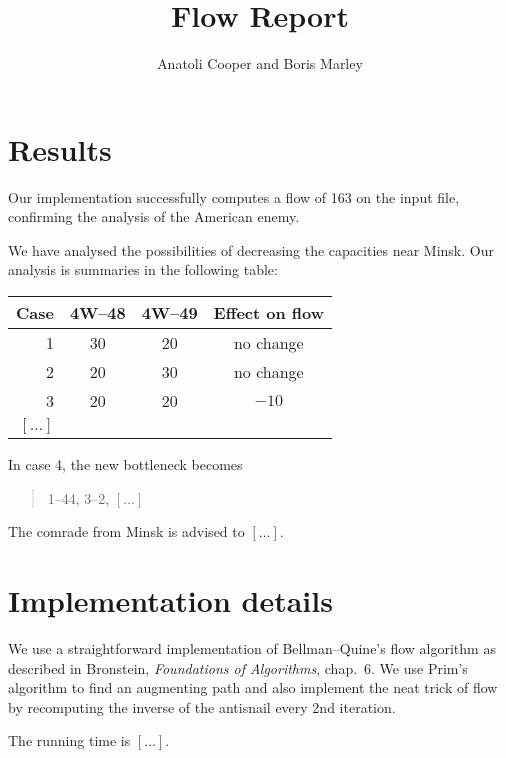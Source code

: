 \documentclass{tufte-handout}
\title{Flow Report}
\author{Anatoli Cooper and Boris Marley}
\begin{document}
  \maketitle

  \section{Results}

  Our implementation successfully computes a flow of 163 on the input file, confirming the analysis of the American enemy.

  We have analysed the possibilities of decreasing the capacities near Minsk.
  Our analysis is summaries in the following table:

\bigskip
  \begin{tabular}{rccc}\toprule
    Case & 4W--48 & 4W--49 & Effect on flow \\\midrule
    1& 30& 20 & no change \\
    2& 20 &30 & no change \\
    3&20 & 20& $-10$ \\
    $[\ldots]$ \\\bottomrule
  \end{tabular}
  \bigskip

  In case 4, the new bottleneck becomes
  \begin{quote}
      1--44, 3--2, $[\ldots]$
  \end{quote}
  The comrade from Minsk is advised to $[\ldots]$.

  \section{Implementation details}

  We use a straightforward implementation of Bellman--Quine's flow algorithm as described in Bronstein, \emph{Foundations of Algorithms}, chap.~6.
  We use Prim's algorithm to find an augmenting path and also implement the neat trick of flow by recomputing the inverse of the antisnail every 2nd iteration.

  The running time is $[\ldots]$.
\end{document}
